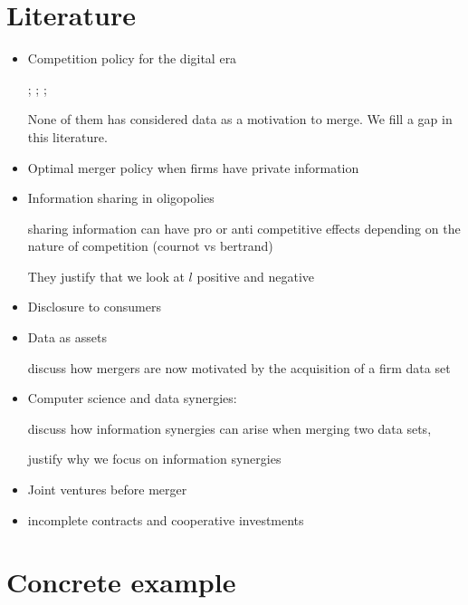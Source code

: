 \documentclass[a4paper,leqno]{article}%
\begin{document}
\section{Literature}
\begin{itemize}\setlength\itemsep{-1em}
    \item Competition policy for the digital era
    
    \cite{tirole2020competition}; \cite{scott2019committee}; \cite{cremer2019competition}; \cite{cabral2020merger}
    
    None of them has considered data as a motivation to merge. We fill a gap in this literature.
    
    \item Optimal merger policy when firms have private information \cite{Besanko1993}
    \item Information sharing in oligopolies
    
    \cite{vives1984duopoly, gal1986information} sharing information can have pro or anti competitive effects depending on the nature of competition (cournot vs bertrand)
    
    They justify that we look at $l$ positive and negative
    \item Disclosure to consumers 
    \item Data as assets
    
    \cite{stucke2016introduction} discuss how mergers are now motivated by the acquisition of a firm data set
    \item Computer science and data synergies:
    
    \cite{bertschinger2014quantifying, Griffith2014, olbrich2015information} discuss how information synergies can arise when merging two data sets, 
    
    justify why we focus on information synergies
    \item Joint ventures before merger
    \item incomplete contracts and cooperative investments \citep{Che1999}
\end{itemize}



\section{Concrete example}
\end{document}

